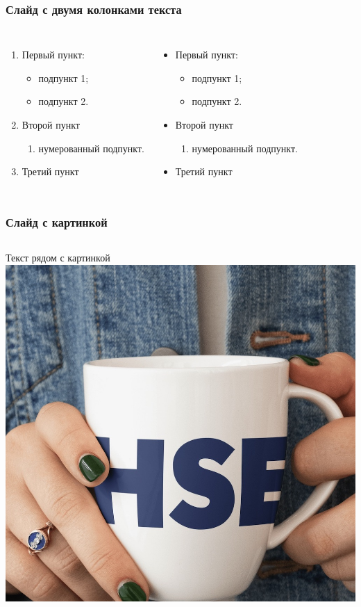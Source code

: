 \documentclass[aspectratio=169]{beamer}
\begin{document}
\begin{frame}
\frametitle{Слайд с двумя колонками текста}
	 \begin{columns}
		\begin{enumerate} 
		\item Первый пункт:
		\begin{itemize}
			\item подпункт 1;
			\item подпункт 2.
		\end{itemize}
		\item Второй пункт
		\begin{enumerate}
			\item нумерованный подпункт.
		\end{enumerate} 
		\item Третий пункт
	\end{enumerate} 
	\begin{itemize}
		\item Первый пункт:
		\begin{itemize}
			\item подпункт 1;
			\item подпункт 2.
		\end{itemize}
		\item Второй пункт
		\begin{enumerate}
			\item нумерованный подпункт.
		\end{enumerate}
		\item Третий пункт
	\end{itemize}
	\end{columns}
\end{frame}

\begin{frame}
\frametitle{Слайд с картинкой}
\medskip
	 \begin{columns}
	 \column{0.5\textwidth}
		Текст рядом с картинкой
		\column{0.5\textwidth}
		\includegraphics[width=\columnwidth]{image1}
	\end{columns}
\end{frame}
\end{document}
